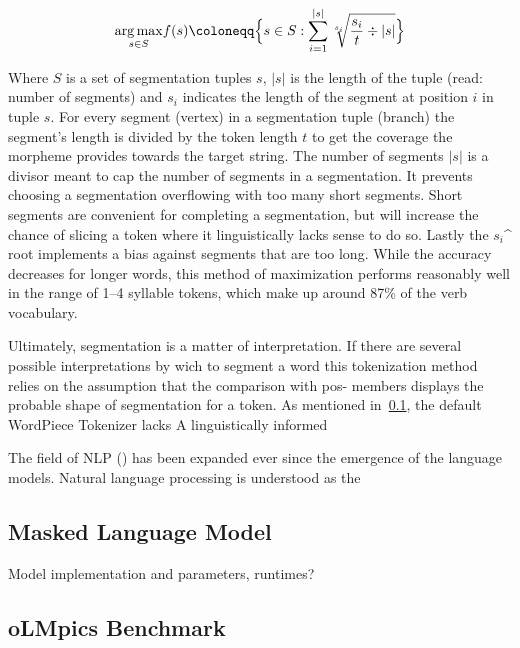 \begin{equation}\label{eq:maximization}
    \underset{s \in S}{\arg\max} f(s) \coloneqq  \Bigl\{ s \in S : \sum_{i=1}^{|s|} \sqrt[s_{i}]{\frac{s_{i}}{t} \div |s|}\Bigr\}
\end{equation}

Where $S$ is a set of segmentation tuples $s$, $|s|$ is the length of the tuple (read: number of segments) and $s_{i}$ indicates the length of the segment at position $i$ in tuple $s$.
For every segment (vertex) in a segmentation tuple (branch)  the segment's length is divided by the token length $t$ to get the coverage the morpheme provides towards the target string.
The number of segments $|s|$ is a divisor meant to cap the number of segments in a segmentation.
It prevents choosing a segmentation overflowing with too many short segments.
Short segments are convenient for completing a segmentation, but will increase the chance of slicing a token where it linguistically lacks sense to do so.
Lastly the $s_{i}$^{} root implements a bias against segments that are too long.
While the accuracy decreases for longer words, this method of maximization performs reasonably well in the range of 1--4 syllable tokens, which make up around 87\% of the verb vocabulary.


Ultimately, segmentation is a matter of interpretation.
If there are several possible interpretations by wich to segment a word this tokenization method relies on the assumption that the comparison with \ac{pos}- members displays the probable shape of segmentation for a token.
As mentioned in~\ref{subsec:masked-language-model}, the default WordPiece Tokenizer lacks
A linguistically informed



The field of NLP  (\cite{METZLER2016}) has been expanded ever since the emergence of the language models.
Natural language processing is understood as the



\subsection{Masked Language Model}
\label{subsec:masked-language-model}
Model implementation and parameters, runtimes?

\subsection{oLMpics Benchmark}
\label{subsec:olmpics-benchmark}